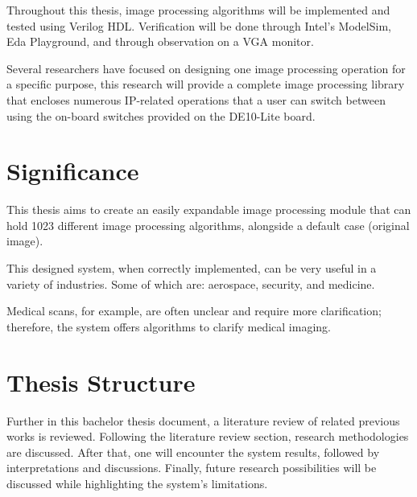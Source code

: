 \par Throughout this thesis, image processing algorithms will be implemented and tested using Verilog HDL. Verification will be done through Intel's ModelSim, Eda Playground, and through observation on a VGA monitor.\newline

\par  Several researchers have focused on designing one image processing operation for a specific purpose, this research will provide a complete image processing library that encloses numerous IP-related operations that a user can switch between using the on-board switches provided on the DE10-Lite board.\newline

\section{Significance}
\par This thesis aims to create an easily expandable image processing module that can hold 1023 different image processing algorithms, alongside a default case (original image). \newline
\par This designed system, when correctly implemented, can be very useful in a variety of industries. Some of which are: aerospace, security, and medicine. \newline
\par Medical scans, for example, are often unclear and require more clarification; therefore, the system offers algorithms to clarify medical imaging.

\section{Thesis Structure}

\par Further in this bachelor thesis document, a literature review of related previous works is reviewed. Following the literature review section, research methodologies are discussed. After that, one will encounter the system results, followed by interpretations and discussions. Finally, future research possibilities will be discussed while highlighting the system's limitations. \newline


%
